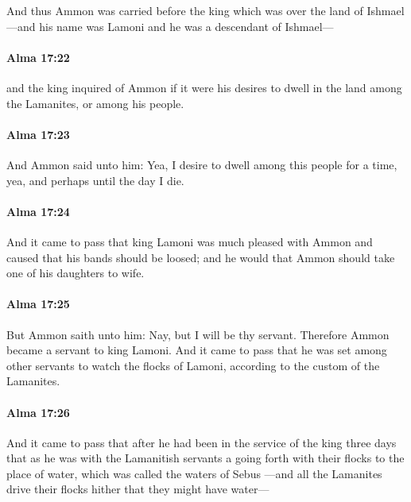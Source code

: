 			And thus Ammon was carried before the king which was over the land of Ishmael
			---and his name was Lamoni and he was a descendant of Ishmael---

		\paragraph{Alma 17:22} %
			\label{ALMA-17-22}

			and the king inquired of Ammon
			if it were his desires to dwell in the land
			among the Lamanites, or among his people.

		\paragraph{Alma 17:23} %
			\label{ALMA-17-23}

			And Ammon said unto him:
			Yea, I desire to dwell among this people for a time,
			yea, and perhaps until the day I die.

		\paragraph{Alma 17:24} %
			\label{ALMA-17-24}

			And it came to pass that king Lamoni was much pleased with Ammon
			and caused that his bands should be loosed;
			and he would that Ammon should take one of his daughters to wife.

		\paragraph{Alma 17:25} %
			\label{ALMA-17-25}

			But Ammon saith unto him:
			Nay, but I will be thy servant.
			Therefore Ammon became a servant to king Lamoni.
			And it came to pass that he was set among other servants
			to watch the flocks of Lamoni, according to the custom of the Lamanites.

		\paragraph{Alma 17:26} %
			\label{ALMA-17-26}

			And it came to pass that after he had been in the service of the king three days
			that as he was with the Lamanitish servants
			a going forth with their flocks to the place of water,
			which was called the waters of Sebus
			---and all the Lamanites drive their flocks hither that they might have water---

